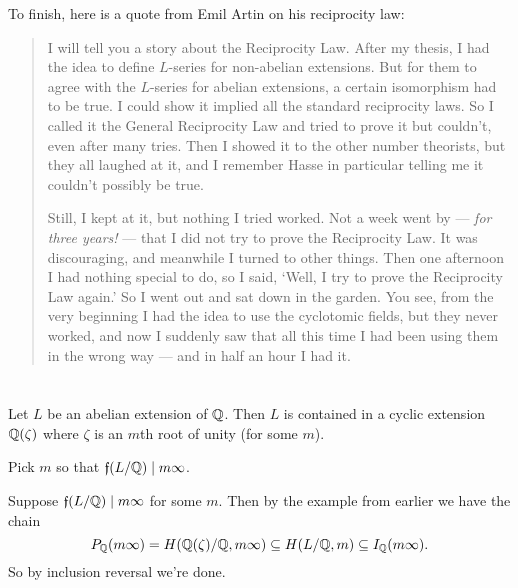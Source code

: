 To finish, here is a quote from Emil Artin on his reciprocity law:
\begin{quote}
	I will tell you a story about the Reciprocity Law.
	After my thesis, I had the idea to define $L$-series
	for non-abelian extensions. But for them to agree
	with the $L$-series for abelian extensions,
	a certain isomorphism had to be true.
	I could show it implied all the standard reciprocity laws.
	So I called it the General Reciprocity Law and tried to prove it but couldn't,
	even after many tries. Then I showed it to the other number theorists,
	but they all laughed at it, and I remember Hasse in particular
	telling me it couldn't possibly be true.

	Still, I kept at it, but nothing I tried worked.
	Not a week went by --- \emph{for three years!} ---
	that I did not try to prove the Reciprocity Law.
	It was discouraging, and meanwhile I turned to other things.
	Then one afternoon I had nothing special to do, so I said,
	`Well, I try to prove the Reciprocity Law again.'
	So I went out and sat down in the garden.  You see,
	from the very beginning I had the idea to use the cyclotomic fields,
	but they never worked, and now I suddenly saw that all this time
	I had been using them in the wrong way
	--- and in half an hour I had it.
\end{quote}

\section{\problemhead}
\begin{dproblem}
	Let $L$ be an abelian extension of $\mathbb Q$.
	Then $L$ is contained in a cyclic extension $\mathbb Q(\zeta)$
	where $\zeta$ is an $m$th root of unity (for some $m$).
	\begin{hint}
		Pick $m$ so that $\mathfrak f(L/\mathbb Q) \mid m\infty$.
	\end{hint}
	\begin{sol}
		Suppose $\mathfrak f(L/\mathbb Q) \mid m\infty$ for some $m$.
		Then by the example from earlier we have the chain
		\[ P_{\mathbb Q}(m\infty) = H(\mathbb Q(\zeta)/\mathbb Q, m\infty)
			\subseteq H(L/\mathbb Q, m) \subseteq I_\mathbb Q(m\infty). \]
		So by inclusion reversal we're done.
	\end{sol}
\end{dproblem}


